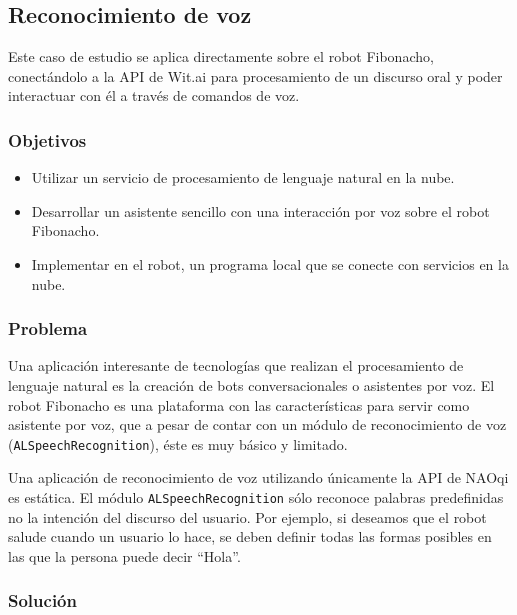 \subsection{Reconocimiento de voz}

Este caso de estudio se aplica
directamente sobre el robot Fibonacho, conectándolo
a la API de Wit.ai para procesamiento de
un discurso oral y poder interactuar con él a través de comandos de voz.


\subsubsection{Objetivos}

\begin{itemize}

    \item Utilizar un servicio de procesamiento
    de lenguaje natural en la nube.
    \item Desarrollar un asistente sencillo con una interacción por voz sobre el robot Fibonacho.
    \item Implementar en el robot, un programa local
    que se conecte con servicios en la nube.
    
\end{itemize}

\subsubsection{Problema}


Una aplicación interesante de tecnologías que realizan el
procesamiento de lenguaje natural es la creación de bots conversacionales
o asistentes por voz.
El robot Fibonacho es una plataforma con las características
para servir como asistente por voz, que a pesar de contar con un
módulo de reconocimiento de voz (\texttt{ALSpeechRecognition}), éste es muy 
básico y limitado.

Una aplicación de reconocimiento de voz
utilizando únicamente la API de NAOqi es estática.
El módulo \texttt{ALSpeechRecognition} sólo reconoce
palabras predefinidas no la intención
del discurso del usuario.
Por ejemplo, si deseamos que el robot salude
cuando un usuario lo hace, se deben 
definir todas las formas posibles en las que
la persona puede decir ``Hola''.

\subsubsection{Solución}

